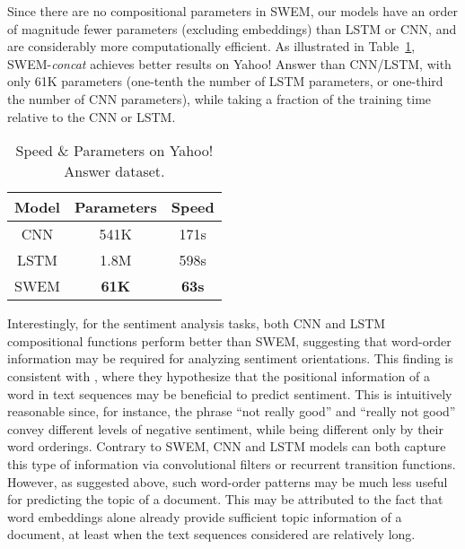 \documentclass[11pt,a4paper]{article}
\begin{document}
Since there are no compositional parameters in SWEM, our models have an order of magnitude fewer parameters (excluding embeddings) than LSTM or CNN, and are considerably more computationally efficient.
As illustrated in Table~\ref{tab:yahoo}, SWEM-\emph{concat} achieves better results on Yahoo! Answer than CNN/LSTM, with only 61K parameters (one-tenth the number of LSTM parameters, or one-third the number of CNN parameters), while taking a fraction of the training time relative to the CNN or LSTM.

\begin{table}[h!]
\centering 
	\def\arraystretch{1.0}
	\begin{small}
		\begin{tabular} {c||c|c} \toprule[1.2pt]
			\textbf{Model} & Parameters & Speed \\\hline
			CNN    & 541K & 171s   \\
LSTM  & 1.8M & 598s   \\
SWEM     & \textbf{61K} &  \textbf{63s} \\\bottomrule[1.2pt]
		\end{tabular}
	\end{small}
\caption{Speed \& Parameters on Yahoo! Answer dataset.}
	\label{tab:yahoo}
	\vspace{-5mm}
\end{table}

Interestingly, for the sentiment analysis tasks, both CNN and LSTM compositional functions perform better than SWEM, suggesting that word-order information may be required for analyzing sentiment orientations.
This finding is consistent with \citet{pang2002thumbs}, where they hypothesize that the positional information of a word in text sequences may be beneficial to predict sentiment.
This is intuitively reasonable since, for instance, the phrase ``not really good'' and ``really not good'' convey different levels of negative sentiment, while being different only by their word orderings.
Contrary to SWEM, CNN and LSTM models can both capture this type of information via convolutional filters or recurrent transition functions.
However, as suggested above, such word-order patterns may be much less useful for predicting the topic of a document.
This may be attributed to the fact that word embeddings alone already provide sufficient topic information of a document, at least when the text sequences considered are relatively long.
\end{document}

